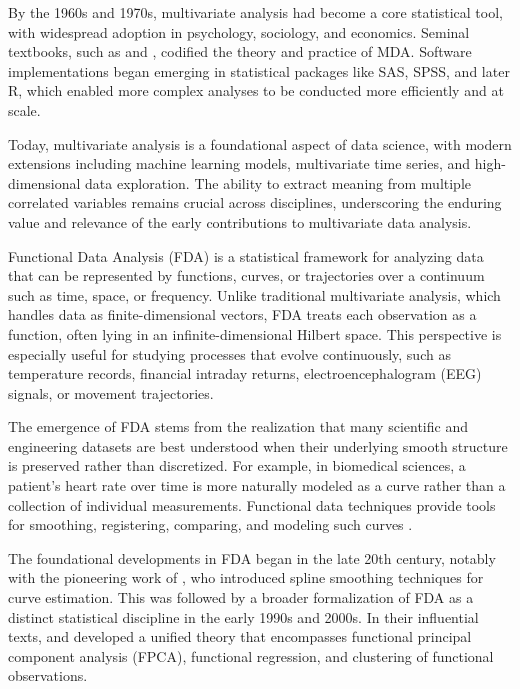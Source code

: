 \documentclass[article]{abntex2}
\begin{document}
By the 1960s and 1970s, multivariate analysis had become a core statistical tool, with widespread adoption in psychology, sociology, and economics. Seminal textbooks, such as  and , codified the theory and practice of MDA. Software implementations began emerging in statistical packages like SAS, SPSS, and later R, which enabled more complex analyses to be conducted more efficiently and at scale.

Today, multivariate analysis is a foundational aspect of data science, with modern extensions including machine learning models, multivariate time series, and high-dimensional data exploration. The ability to extract meaning from multiple correlated variables remains crucial across disciplines, underscoring the enduring value and relevance of the early contributions to multivariate data analysis.

Functional Data Analysis (FDA) is a statistical framework for analyzing data that can be represented by functions, curves, or trajectories over a continuum such as time, space, or frequency. Unlike traditional multivariate analysis, which handles data as finite-dimensional vectors, FDA treats each observation as a function, often lying in an infinite-dimensional Hilbert space. This perspective is especially useful for studying processes that evolve continuously, such as temperature records, financial intraday returns, electroencephalogram (EEG) signals, or movement trajectories.

The emergence of FDA stems from the realization that many scientific and engineering datasets are best understood when their underlying smooth structure is preserved rather than discretized. For example, in biomedical sciences, a patient’s heart rate over time is more naturally modeled as a curve rather than a collection of individual measurements. Functional data techniques provide tools for smoothing, registering, comparing, and modeling such curves .

The foundational developments in FDA began in the late 20th century, notably with the pioneering work of , who introduced spline smoothing techniques for curve estimation. This was followed by a broader formalization of FDA as a distinct statistical discipline in the early 1990s and 2000s. In their influential texts,  and  developed a unified theory that encompasses functional principal component analysis (FPCA), functional regression, and clustering of functional observations.
\end{document}
